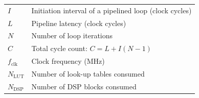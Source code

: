 \begin{tabular}{@{}ll}
  $I$                & Initiation interval of a pipelined loop (clock cycles) \\
  $L$                & Pipeline latency (clock cycles) \\
  $N$                & Number of loop iterations \\
  $C$                & Total cycle count: $C = L + I(N-1)$ \\
  $f_{\text{clk}}$   & Clock frequency (\si{\mega\hertz}) \\
  $N_{\text{LUT}}$   & Number of look-up tables consumed \\
  $N_{\text{DSP}}$   & Number of DSP blocks consumed \\
\end{tabular}
